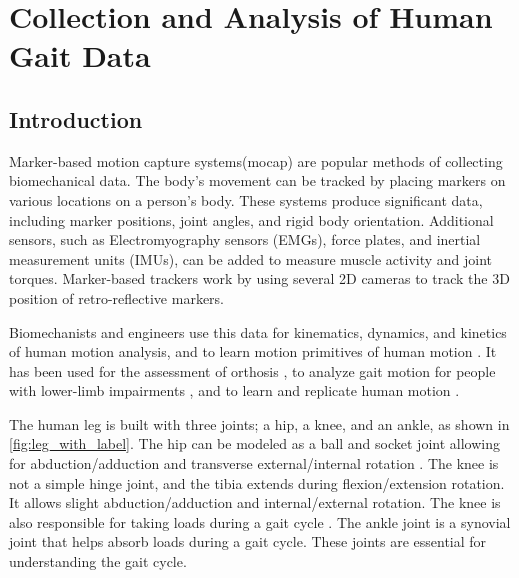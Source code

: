 \chapter{Collection and Analysis of Human Gait Data}
\label{chap:gaitdata}
\section{Introduction}

Marker-based motion capture systems(mocap) are popular methods of collecting biomechanical data. The body's movement can be tracked by placing markers on various locations on a person's body. These systems produce significant data, including marker positions, joint angles, and rigid body orientation. Additional sensors, such as Electromyography sensors (EMGs), force plates, and inertial measurement units (IMUs), can be added to measure muscle activity and joint torques. Marker-based trackers work by using several 2D cameras to track the 3D position of retro-reflective markers.  

Biomechanists and engineers use this data for kinematics, dynamics, and kinetics of human motion analysis, and to learn motion primitives of human motion \cite{10.7717/peerj.918}. It has been used for the assessment of orthosis \cite{kobetic2009development},  to analyze gait motion for people with lower-limb impairments \cite{lauer2005application} \cite{hicks2011lower}  \cite{cutler2015using} , and to learn and replicate human motion \cite{ott2008motion} \cite{chalodhorn2007learning}. 

The human leg is built with three joints; a hip, a knee, and an ankle, as shown in \autoref{fig:leg_with_label}. The hip can be modeled as a ball and socket joint allowing for abduction/adduction and transverse external/internal rotation \cite{faptakinesiology}. The knee is not a simple hinge joint, and the tibia extends during flexion/extension rotation. It allows slight abduction/adduction and internal/external rotation. The knee is also responsible for taking loads during a gait cycle \cite{kuo2007six}. The ankle joint is a synovial joint that helps absorb loads during a gait cycle. These joints are essential for understanding the gait cycle.


